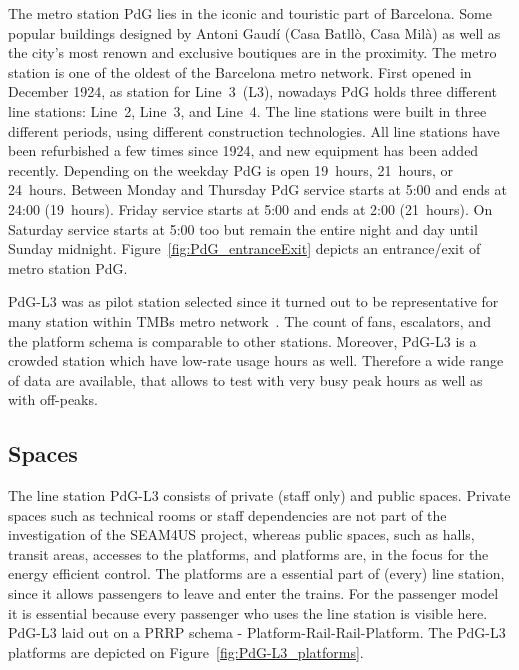 The metro station PdG lies in the iconic and touristic part of Barcelona. Some popular buildings designed by Antoni Gaud\'{i} (Casa Batll\`{o}, Casa Mil\`{a}) as well as the city's most renown and exclusive boutiques are in the proximity.
The metro station is one of the oldest of the Barcelona metro network. First opened in December 1924, as station for Line~3~(L3), nowadays PdG holds three different line stations: Line~2, Line~3, and Line~4. The line stations were built in three different periods, using different construction technologies. All line stations have been refurbished a few times since 1924, and new equipment has been added recently.
Depending on the weekday PdG is open 19~hours, 21~hours, or 24~hours. Between Monday and Thursday PdG service starts at 5:00 and ends at 24:00 (19~hours). Friday service starts at 5:00 and ends at 2:00 (21~hours). On Saturday service starts at 5:00 too but remain the entire night and day until Sunday midnight.
Figure~\ref{fig:PdG_entranceExit} depicts an entrance/exit of metro station PdG.

PdG-L3 was as pilot station selected since it turned out to be representative for many station within TMBs metro network~\cite{TMB_2014}. The count of fans, escalators, and the platform schema is comparable to other stations. Moreover, PdG-L3 is a crowded station which have low-rate usage hours as well. Therefore a wide range of data are available, that allows to test with very busy peak hours as well as with off-peaks.


\subsection{Spaces}
\label{subsec:PdG-L3_spaces}

The line station PdG-L3 consists of private (staff only) and public spaces. Private spaces such as technical rooms or staff dependencies are not part of the investigation of the SEAM4US project, whereas public spaces, such as halls, transit areas, accesses to the platforms, and platforms are, in the focus for the energy efficient control.
The platforms are a essential part of (every) line station, since it allows passengers to leave and enter the trains. For the passenger model it is essential because every passenger who uses the line station is visible here. PdG-L3 laid out on a PRRP schema - Platform-Rail-Rail-Platform. The PdG-L3 platforms are depicted on Figure~\ref{fig:PdG-L3_platforms}.

